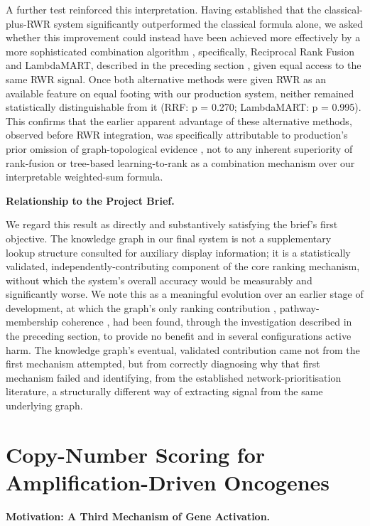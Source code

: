 \documentclass[author={Karen Coutinho, Ishaan Bhalla, Aman Raj, Dixit Kaloorani Malarmannan},
                supervisor={Dr. Daniel D'Andrea},
                degree={MSc},
                title={CellSelector Omics: A Multi-Omics Recommendation System for Cell Line Selection},
                subtitle={},
                type={},
                year={2026}]{dissertation}
\begin{document}
A further test reinforced this interpretation. Having established that the classical-plus-RWR system significantly outperformed the classical formula alone, we asked whether this improvement could instead have been achieved more effectively by a more sophisticated combination algorithm , specifically, Reciprocal Rank Fusion and LambdaMART, described in the preceding section , given equal access to the same RWR signal. Once both alternative methods were given RWR as an available feature on equal footing with our production system, neither remained statistically distinguishable from it (RRF: p = 0.270; LambdaMART: p = 0.995). This confirms that the earlier apparent advantage of these alternative methods, observed before RWR integration, was specifically attributable to production's prior omission of graph-topological evidence , not to any inherent superiority of rank-fusion or tree-based learning-to-rank as a combination mechanism over our interpretable weighted-sum formula.

{\bf Relationship to the Project Brief.}

We regard this result as directly and substantively satisfying the brief's first objective. The knowledge graph in our final system is not a supplementary lookup structure consulted for auxiliary display information; it is a statistically validated, independently-contributing component of the core ranking mechanism, without which the system's overall accuracy would be measurably and significantly worse. We note this as a meaningful evolution over an earlier stage of development, at which the graph's only ranking contribution , pathway-membership coherence , had been found, through the investigation described in the preceding section, to provide no benefit and in several configurations active harm. The knowledge graph's eventual, validated contribution came not from the first mechanism attempted, but from correctly diagnosing why that first mechanism failed and identifying, from the established network-prioritisation literature, a structurally different way of extracting signal from the same underlying graph.

\section{Copy-Number Scoring for Amplification-Driven Oncogenes}

{\bf Motivation: A Third Mechanism of Gene Activation.}
\end{document}
